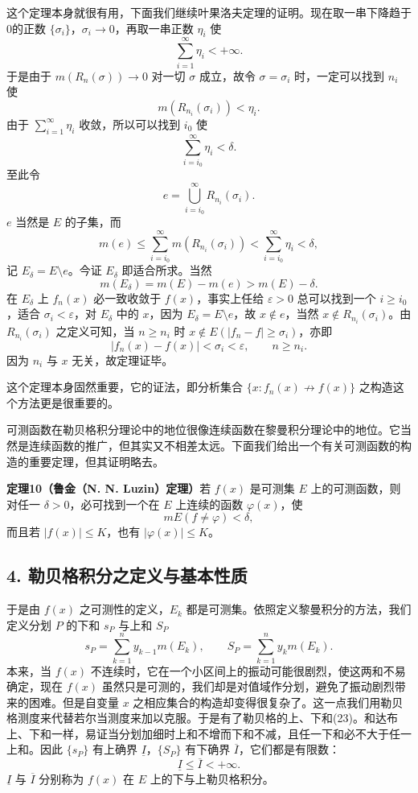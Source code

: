 这个定理本身就很有用，下面我们继续叶果洛夫定理的证明。现在取一串下降趋于0的正数 $\{\sigma_i\}$，$\sigma_i\to0$，再取一串正数 $\eta_i$ 使
\[
 \sum_{i=1}^{\infty}\eta_i<+\infty.
\]
于是由于 $m(R_n(\sigma))\to0$ 对一切 $\sigma$ 成立，故令 $\sigma=\sigma_i$ 时，一定可以找到 $n_i$ 使
\[
 m(R_{n_i}(\sigma_i))<\eta_i.
\]
由于 $\sum_{i=1}^{\infty}\eta_i$ 收敛，所以可以找到 $i_0$ 使
\[
 \sum_{i=i_0}^{\infty}\eta_i<\delta.
\]
至此令
\[
 e=\bigcup_{i=i_0}^{\infty}R_{n_i}(\sigma_i).
\]
$e$ 当然是 $E$ 的子集，而
\[
 m(e)\le\sum_{i=i_0}^{\infty}m(R_{n_i}(\sigma_i))<\sum_{i=i_0}^{\infty}\eta_i<\delta,
\]
记 $E_\delta=E\setminus e$。今证 $E_\delta$ 即适合所求。当然
\[
 m(E_\delta)=m(E)-m(e)>m(E)-\delta.
\]
在 $E_\delta$ 上 $f_n(x)$ 必一致收敛于 $f(x)$，事实上任给 $\varepsilon>0$ 总可以找到一个 $i\ge i_0$，适合 $\sigma_i<\varepsilon$，对 $E_\delta$ 中的 $x$，因为 $E_\delta=E\setminus e$，故 $x\notin e$，当然 $x\notin R_{n_i}(\sigma_i)$。由 $R_{n_i}(\sigma_i)$ 之定义可知，当 $n\ge n_i$ 时 $x\notin E(|f_n-f|\ge\sigma_i)$，亦即
\[
 |f_n(x)-f(x)|<\sigma_i<\varepsilon,\qquad n\ge n_i.
\]
因为 $n_i$ 与 $x$ 无关，故定理证毕。

这个定理本身固然重要，它的证法，即分析集合 $\{x:f_n(x)\not\to f(x)\}$ 之构造这个方法更是很重要的。

可测函数在勒贝格积分理论中的地位很像连续函数在黎曼积分理论中的地位。它当然是连续函数的推广，但其实又不相差太远。下面我们给出一个有关可测函数的构造的重要定理，但其证明略去。

\noindent\textbf{定理10（鲁金（N. N. Luzin）定理）}\quad 若 $f(x)$ 是可测集 $E$ 上的可测函数，则对任一 $\delta>0$，必可找到一个在 $E$ 上连续的函数 $\varphi(x)$，使
\[
 mE(f\ne\varphi)<\delta,
\]
而且若 $|f(x)|\le K$，也有 $|\varphi(x)|\le K$。

\subsection*{4. 勒贝格积分之定义与基本性质}

于是由 $f(x)$ 之可测性的定义，$E_k$ 都是可测集。依照定义黎曼积分的方法，我们定义分划 $P$ 的下和 $s_P$ 与上和 $S_P$
\[
s_P=\sum_{k=1}^{n}y_{k-1}m(E_k),\qquad
S_P=\sum_{k=1}^{n}y_km(E_k). \tag{23}
\]
本来，当 $f(x)$ 不连续时，它在一个小区间上的振动可能很剧烈，使这两和不易确定，现在 $f(x)$ 虽然只是可测的，我们却是对值域作分划，避免了振动剧烈带来的困难。但是自变量 $x$ 之相应集合的构造却变得很复杂了。这一点我们用勒贝格测度来代替若尔当测度来加以克服。于是有了勒贝格的上、下和(23)。和达布上、下和一样，易证当分划加细时上和不增而下和不减，且任一下和必不大于任一上和。因此 $\{s_P\}$ 有上确界 $\underline I$，$\{S_P\}$ 有下确界 $\overline I$，它们都是有限数：
\[
\underline I\le \overline I<+\infty.
\]
$\underline I$ 与 $\overline I$ 分别称为 $f(x)$ 在 $E$ 上的下与上勒贝格积分。


